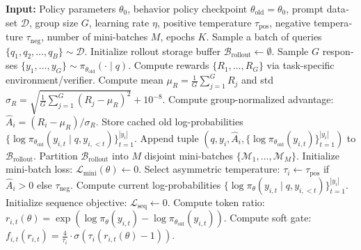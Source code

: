 \begin{latin}
\begin{algorithm}[H]
\caption{Soft Adaptive Policy Optimization (SAPO)}
\label{alg:sapo_pseudocode}
\begin{algorithmic}[1]
\State \textbf{Input:} Policy parameters $\theta_0$, behavior policy checkpoint $\theta_{\text{old}} = \theta_0$, prompt dataset $\mathcal{D}$, group size $G$, learning rate $\eta$, positive temperature $\tau_{\text{pos}}$, negative temperature $\tau_{\text{neg}}$, number of mini-batches $M$, epochs $K$.
    \State Sample a batch of queries $\{q_1, q_2, \dots, q_B\} \sim \mathcal{D}$.
    \State Initialize rollout storage buffer $\mathcal{B}_{\text{rollout}} \leftarrow \emptyset$.
        \State Sample $G$ responses $\{y_1, \dots, y_G\} \sim \pi_{\theta_{\text{old}}}(\cdot \mid q)$.
        \State Compute rewards $\{R_1, \dots, R_G\}$ via task-specific environment/verifier.
        \State Compute mean $\mu_R = \frac{1}{G}\sum_{j=1}^G R_j$ and std $\sigma_R = \sqrt{\frac{1}{G}\sum_{j=1}^G (R_j - \mu_R)^2} + 10^{-8}$.
            \State Compute group-normalized advantage: $\hat{A}_i = (R_i - \mu_R) / \sigma_R$.
            \State Store cached old log-probabilities $\{\log \pi_{\theta_{\text{old}}}(y_{i,t} \mid q, y_{i,<t})\}_{t=1}^{|y_i|}$.
            \State Append tuple $(q, y_i, \hat{A}_i, \{\log \pi_{\theta_{\text{old}}}(y_{i,t})\}_{t=1}^{|y_i|})$ to $\mathcal{B}_{\text{rollout}}$.
        \EndFor
    \EndFor
    \State Partition $\mathcal{B}_{\text{rollout}}$ into $M$ disjoint mini-batches $\{\mathcal{M}_1, \dots, \mathcal{M}_M\}$.
            \State Initialize mini-batch loss: $\mathcal{L}_{\text{mini}}(\theta) \leftarrow 0$.
                \State Select asymmetric temperature: $\tau_i \leftarrow \tau_{\text{pos}}$ if $\hat{A}_i > 0$ else $\tau_{\text{neg}}$.
                \State Compute current log-probabilities $\{\log \pi_\theta(y_{i,t} \mid q, y_{i,<t})\}_{t=1}^{|y_i|}$.
                \State Initialize sequence objective: $\mathcal{L}_{\text{seq}} \leftarrow 0$.
                    \State Compute token ratio: $r_{i,t}(\theta) = \exp\left( \log \pi_\theta(y_{i,t}) - \log \pi_{\theta_{\text{old}}}(y_{i,t}) \right)$.
                    \State Compute soft gate: $f_{i,t}(r_{i,t}) = \frac{4}{\tau_i} \cdot \sigma\left(\tau_i (r_{i,t}(\theta) - 1)\right)$.

\end{algorithmic}
\end{algorithm}
\end{latin}
